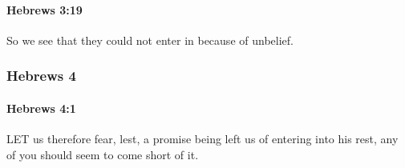		\paragraph{Hebrews 3:19} %
			\label{HEBREWS-3-19}

			So we see that they could not enter in because of unbelief.

			\begin{framed}
			\scriptsize
				\begin{compactdesc}
					\item[SBLG] 
				\end{compactdesc}
			\end{framed}

	\subsubsection{Hebrews 4} %
		\label{HEBREWS-4}
		
		\paragraph{Hebrews 4:1} %
			\label{HEBREWS-4-1}

			LET us therefore fear, lest, a promise being left us of entering into his rest, any of you should seem to come short of it.


